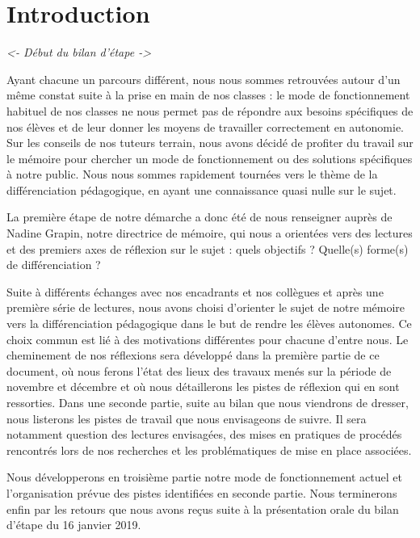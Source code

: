 \section{Introduction}

\textit{<- Début du bilan d'étape ->}

Ayant chacune un parcours différent, nous nous sommes retrouvées autour d’un même constat suite à la prise en main de nos classes : le mode de fonctionnement habituel de nos classes ne nous permet pas de répondre aux besoins spécifiques de nos élèves et de leur donner les moyens de travailler correctement en autonomie. Sur les conseils de nos tuteurs terrain, nous avons décidé de profiter du travail sur le mémoire pour chercher un mode de fonctionnement ou des solutions spécifiques à notre public. Nous nous sommes rapidement tournées vers le thème de la différenciation pédagogique, en ayant une connaissance quasi nulle sur le sujet.

La première étape de notre démarche a donc été de nous renseigner auprès de Nadine Grapin, notre directrice de mémoire, qui nous a orientées vers des lectures et des premiers axes de réflexion sur le sujet : quels objectifs ? Quelle(s) forme(s) de différenciation ? 

Suite à différents échanges avec nos encadrants et nos collègues et après une première série de lectures, nous avons choisi d’orienter le sujet de notre mémoire vers la différenciation pédagogique dans le but de rendre les élèves autonomes. Ce choix commun est lié à des motivations différentes pour chacune d’entre nous. 
Le cheminement de nos réflexions sera développé dans la première partie de ce document, où nous ferons l’état des lieux des travaux menés sur la période de novembre et décembre et où nous détaillerons les pistes de réflexion qui en sont ressorties.
Dans une seconde partie, suite au bilan que nous viendrons de dresser, nous listerons les pistes de travail que nous envisageons de suivre. Il sera notamment question des lectures envisagées, des mises en pratiques de procédés rencontrés lors de nos recherches et les problématiques de mise en place associées.

Nous développerons en troisième partie notre mode de fonctionnement actuel et l’organisation prévue des pistes identifiées en seconde partie.
Nous terminerons enfin par les retours que nous avons reçus suite à la présentation orale du bilan d’étape du 16 janvier 2019. 

